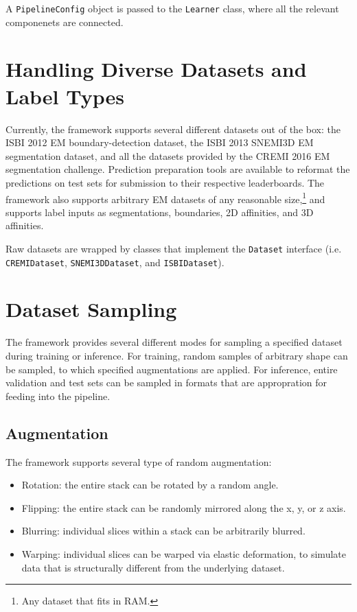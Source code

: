 A \texttt{PipelineConfig} object is passed to the \texttt{Learner} class, where all the relevant componenets are connected.

\section{Handling Diverse Datasets and Label Types}

Currently, the framework supports several different datasets out of the box: the ISBI 2012 EM boundary-detection dataset, the ISBI 2013 SNEMI3D EM segmentation dataset, and all the datasets provided by the CREMI 2016 EM segmentation challenge. Prediction preparation tools are available to reformat the predictions on test sets for submission to their respective leaderboards. The framework also supports arbitrary EM datasets of any reasonable size,\footnote{Any dataset that fits in RAM.} and supports label inputs as segmentations, boundaries, 2D affinities, and 3D affinities.

Raw datasets are wrapped by classes that implement the \texttt{Dataset} interface (i.e. \texttt{CREMIDataset}, \texttt{SNEMI3DDataset}, and \texttt{ISBIDataset}).


\section{Dataset Sampling}

The framework provides several different modes for sampling a specified dataset during training or inference. For training, random samples of arbitrary shape can be sampled, to which specified augmentations are applied. For inference, entire validation and test sets can be sampled in formats that are appropration for feeding into the pipeline.

\subsection{Augmentation}

The framework supports several type of random augmentation:

\begin{itemize}
	\item Rotation: the entire stack can be rotated by a random angle.
	\item Flipping: the entire stack can be randomly mirrored along the x, y, or z axis.
	\item Blurring: individual slices within a stack can be arbitrarily blurred.
	\item Warping: individual slices can be warped via elastic deformation, to simulate data that is structurally different from the underlying dataset.
\end{itemize}

